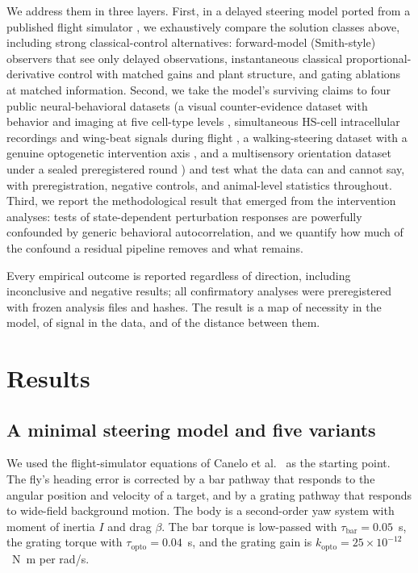 \documentclass[pdflatex,sn-nature]{sn-jnl}
\begin{document}
We address them in three layers. First, in a delayed steering model ported from a published flight simulator \cite{canelo2024efference}, we exhaustively compare the solution classes above, including strong classical-control alternatives: forward-model (Smith-style) observers that see only delayed observations, instantaneous classical proportional-derivative control with matched gains and plant structure, and gating ablations at matched information. Second, we take the model's surviving claims to four public neural-behavioral datasets (a visual counter-evidence dataset with behavior and imaging at five cell-type levels \cite{tanaka2023neural}, simultaneous HS-cell intracellular recordings and wing-beat signals during flight \cite{fischer2022multiple}, a walking-steering dataset with a genuine optogenetic intervention axis \cite{rayshubskiy2025neural}, and a multisensory orientation dataset under a sealed preregistered round \cite{currier2018multisensory}) and test what the data can and cannot say, with preregistration, negative controls, and animal-level statistics throughout. Third, we report the methodological result that emerged from the intervention analyses: tests of state-dependent perturbation responses are powerfully confounded by generic behavioral autocorrelation, and we quantify how much of the confound a residual pipeline removes and what remains.

Every empirical outcome is reported regardless of direction, including inconclusive and negative results; all confirmatory analyses were preregistered with frozen analysis files and hashes. The result is a map of necessity in the model, of signal in the data, and of the distance between them.

\section{Results}\label{sec:results}

\subsection{A minimal steering model and five variants}

We used the flight-simulator equations of Canelo et al.\ \cite{canelo2024efference} as the starting point. The fly's heading error is corrected by a bar pathway that responds to the angular position and velocity of a target, and by a grating pathway that responds to wide-field background motion. The body is a second-order yaw system with moment of inertia $I$ and drag $\beta$. The bar torque is low-passed with $\tau_{\mathrm{bar}} = 0.05$~s, the grating torque with $\tau_{\mathrm{opto}} = 0.04$~s, and the grating gain is $k_{\mathrm{opto}} = 25 \times 10^{-12}$~N~m per rad/s.
\end{document}
